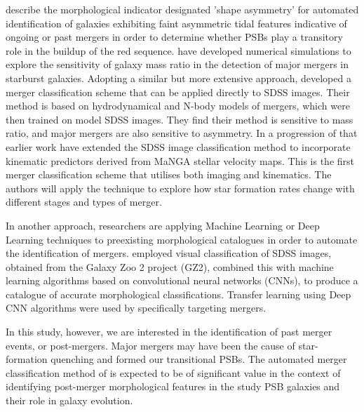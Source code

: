 \cite{2016MNRAS.456.3032P} describe the morphological indicator designated 'shape asymmetry' for automated identification of galaxies exhibiting faint asymmetric tidal features indicative of ongoing or past mergers in order to determine whether PSBs play a transitory role in the buildup of the red sequence. \cite{2011arXiv1102.0550B} have developed numerical simulations to explore the sensitivity of galaxy mass ratio in the detection of major mergers in starburst galaxies. Adopting a similar but more extensive approach, \cite{2019ApJ...872...76N} developed a merger classification scheme that can be applied directly to SDSS images. Their method is based on hydrodynamical and N-body models of mergers, which were then trained on model SDSS images. They find their method is sensitive to mass ratio, and major mergers are also sensitive to asymmetry. In a progression of that earlier work  \cite{2019DDA....5020304N} have extended the SDSS image classification method to incorporate kinematic predictors derived from MaNGA stellar velocity maps. This is the first merger classification scheme that utilises both imaging and kinematics. The authors will apply the technique to explore how star formation rates change with different stages and types of merger. 

In another approach, researchers are applying Machine Learning or Deep Learning techniques to preexisting morphological catalogues in order to automate the identification of mergers. \citet{2018MNRAS.476.3661D} employed visual classification of SDSS images, obtained from the Galaxy Zoo 2 project (GZ2), combined this with machine learning algorithms based on convolutional neural networks (CNNs), to produce a catalogue of accurate morphological classifications. Transfer learning using Deep CNN algorithms were used by \citet{2018MNRAS.479..415A} specifically targeting mergers. 

In this study, however, we are interested in the identification of past merger events, or post-mergers. Major mergers may have been the cause of star-formation quenching and formed our transitional PSBs. The automated merger classification method of  \cite{2019DDA....5020304N} is expected to be of significant value in the context of identifying post-merger morphological features in the study PSB galaxies and their role in galaxy evolution. 


